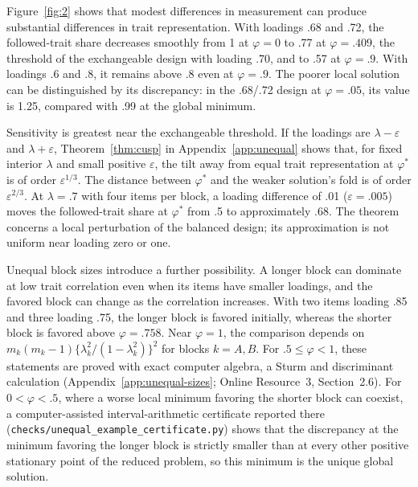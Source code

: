 Figure~\ref{fig:2} shows that modest differences in measurement can produce substantial differences in trait representation. With loadings .68 and .72, the followed-trait share decreases smoothly from 1 at $\varphi=0$ to .77 at $\varphi=.409$, the threshold of the exchangeable design with loading .70, and to .57 at $\varphi=.9$. With loadings .6 and .8, it remains above .8 even at $\varphi=.9$. The poorer local solution can be distinguished by its discrepancy: in the .68/.72 design at $\varphi=.05$, its value is 1.25, compared with .99 at the global minimum.

Sensitivity is greatest near the exchangeable threshold. If the loadings are $\lambda-\varepsilon$ and $\lambda+\varepsilon$, Theorem~\ref{thm:cusp} in Appendix~\ref{app:unequal} shows that, for fixed interior $\lambda$ and small positive $\varepsilon$, the tilt away from equal trait representation at $\varphi^*$ is of order $\varepsilon^{1/3}$. The distance between $\varphi^*$ and the weaker solution's fold is of order $\varepsilon^{2/3}$. At $\lambda=.7$ with four items per block, a loading difference of .01 ($\varepsilon=.005$) moves the followed-trait share at $\varphi^*$ from .5 to approximately .68. The theorem concerns a local perturbation of the balanced design; its approximation is not uniform near loading zero or one.

Unequal block sizes introduce a further possibility. A longer block can dominate at low trait correlation even when its items have smaller loadings, and the favored block can change as the correlation increases. With two items loading .85 and three loading .75, the longer block is favored initially, whereas the shorter block is favored above $\varphi=.758$. Near $\varphi=1$, the comparison depends on $m_k(m_k-1)\{\lambda_k^2/(1-\lambda_k^2)\}^2$ for blocks $k=A,B$. For $.5\le\varphi<1$, these statements are proved with exact computer algebra, a Sturm and discriminant calculation (Appendix~\ref{app:unequal-sizes}; Online Resource~3, Section~2.6). For $0<\varphi<.5$, where a worse local minimum favoring the shorter block can coexist, a computer-assisted interval-arithmetic certificate reported there (\texttt{checks/unequal\_example\_certificate.py}) shows that the discrepancy at the minimum favoring the longer block is strictly smaller than at every other positive stationary point of the reduced problem, so this minimum is the unique global solution.

